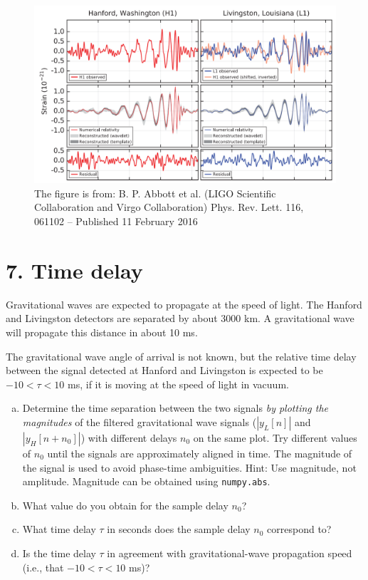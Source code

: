 \begin{figure}
\begin{center}
\includegraphics[width=\textwidth]{Assignments/figures/dc_fg.png}
\end{center}
\caption{The figure is from: B. P. Abbott et al. (LIGO Scientific Collaboration and Virgo Collaboration)
  Phys. Rev. Lett. 116, 061102 – Published 11 February 2016}
\label{fig:ligo_result_plot}
\end{figure}


\section{7. Time delay}

Gravitational waves are expected to propagate at the speed of
light. The Hanford and Livingston detectors are separated by about
3000 km. A gravitational wave will propagate this distance in about 10
ms.

The gravitational wave angle of arrival is not known, but the relative
time delay between the signal detected at Hanford and Livingston is
expected to be $-10 < \tau < 10$ ms, if it is moving at the speed of
light in vacuum.
\begin{enumerate}[a)]
  
\item  Determine the time separation between the two signals \emph{by plotting the magnitudes} of the filtered gravitational wave signals ($|y_L[n]|$ and $|y_H[n+n_0]|$) with different delays $n_0$ on the same plot. Try different values of $n_0$ until the signals are approximately aligned in time. The magnitude of the signal is used to avoid phase-time ambiguities. Hint: Use magnitude, not amplitude. Magnitude can be obtained using \verb|numpy.abs|.
  
\item What value do you obtain for the sample delay $n_0$?
  
\item What time delay $\tau$ in seconds does the sample delay $n_0$ correspond to?
  
\item Is the time delay $\tau$ in agreement with gravitational-wave propagation speed (i.e., that $-10 < \tau < 10$ ms)?
  
\end{enumerate}

